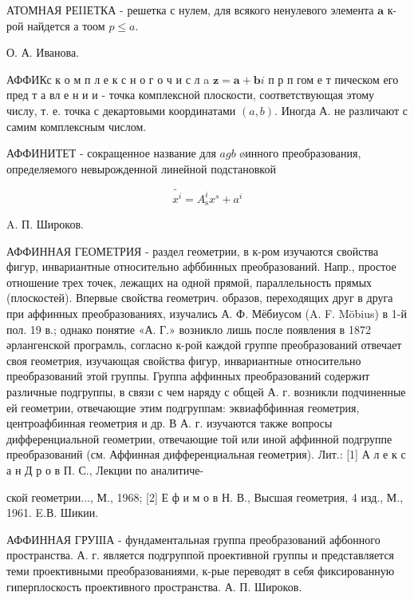 \documentclass[10pt]{article}
\begin{document}
АТОМНАЯ РЕIIЕТКА - решетка с нулем, для всякого ненулевого элемента $\boldsymbol{a}$ к-рой найдется $а$ тоом $p \leqslant a$.



О. А. Иванова.



АФФИКс к о м п л е к с н о г о ч и с л a $\boldsymbol{z}=\boldsymbol{a}+\boldsymbol{b} i$ п р п гом е т пическом его пред т а вл е н и и - точка комплексной плоскости, соответствующая этому числу, т. е. точка с декартовыми координатами $(a, b)$. Иногда А. не различают с самим комплексным числом.



АФФИНИТЕТ - сокращенное название для $a g b$ øинного преобразования, определяемого невырожденной линейной подстановкой



\[

\tilde{x^{i}}=A_{\mathrm{s}}^{i} x^{s}+a^{i}

\]



A. П. Широков.



АФФИННАЯ ГЕОМЕТРИЯ - раздел геометрии, в к-ром изучаются свойства фигур, инвариантные относительно афббинных преобразований. Напр., простое отношение трех точек, лежащих на одной прямой, параллельность прямых (плоскостей). Впервые свойства геометрич. образов, переходящих друг в друга при аффинных преобразованиях, изучались А. Ф. Мёбиусом (A. F. Möbius) в 1-й пол. 19 в.; однако понятие «А. Г.» возникло лишь после появления в 1872 әрлангенской програмль, согласно к-рой каждой группе преобразований отвечает своя геометрия, изучающая свойства фигур, инвариантные относительно преобразований этой группы. Группа аффинных преобразований содержит различные подгруппы, в связи с чем наряду с общей А. г. возникли подчиненные ей геометрии, отвечающие этим подгруппам: эквиафбфинная геометрия, центроафбинная геометрия и др. В А. г. изучаются также вопросы дифференциальной геометрии, отвечающие той или иной аффинной подгруппе преобразований (см. Аффинная дифференциальная геометрия). Лит.: [1] А л е к с а н Д р о в П. С., Лекции по аналитиче-

ской геометрии..., М., 1968; [2] Е ф и м о в Н. В., Высшая геометрия, 4 изд., М., 1961. E.В. Шикии.



АФФИННАЯ ГРУІІІА - фундаментальная группа преобразований афбонного пространства. А. г. является подгруппой проективной группы и представляется теми проективными преобразованиями, к-рые переводят в себя фиксированную гиперплоскость проективного пространства. А. П. Широков.
\end{document}
